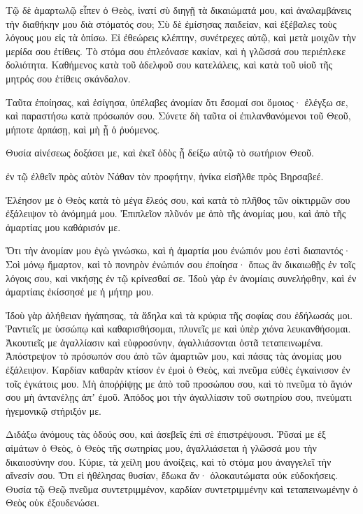 \begin{spacing}{1.1}
\begin{multicols}{2}
Τῷ δὲ ἁμαρτωλῷ εἶπεν ὁ Θεὸς, ἱνατί σὺ διηγῇ τὰ δικαιώματά μου, καὶ ἀναλαμβάνεις τὴν διαθήκην μου διὰ στόματός σου;
Σὺ δὲ ἐμίσησας παιδείαν, καὶ ἐξέβαλες τοὺς λόγους μου εἰς τὰ ὀπίσω.
Εἰ ἐθεώρεις κλέπτην, συνέτρεχες αὐτῷ, καὶ μετὰ μοιχῶν τὴν μερίδα σου ἐτίθεις.
Τὸ στόμα σου ἐπλεόνασε κακίαν, καὶ ἡ γλῶσσά σου περιέπλεκε δολιότητα.
Καθήμενος κατὰ τοῦ ἀδελφοῦ σου κατελάλεις, καὶ κατὰ τοῦ υἱοῦ τῆς μητρός σου ἐτίθεις σκάνδαλον.

Ταῦτα ἐποίησας, καὶ ἐσίγησα, ὑπέλαβες ἀνομίαν ὅτι ἔσομαί σοι ὅμοιος· ἐλέγξω σε, καὶ παραστήσω κατὰ πρόσωπόν σου.
Σύνετε δὴ ταῦτα οἱ ἐπιλανθανόμενοι τοῦ Θεοῦ, μήποτε ἁρπάσῃ, καὶ μὴ ᾖ ὁ ῥυόμενος.

Θυσία αἰνέσεως δοξάσει με, καὶ ἐκεῖ ὁδὸς ᾗ δείξω αὐτῷ τὸ σωτήριον Θεοῦ.

ἐν τῷ ἐλθεῖν πρὸς αὐτὸν Νάθαν τὸν προφήτην, ἡνίκα εἰσῆλθε πρὸς Βηρσαβεέ.

Ἐλέησον με ὁ Θεὸς κατὰ τὸ μέγα ἔλεός σου, καὶ κατὰ τὸ πλῆθος τῶν οἰκτιρμῶν σου ἐξάλειψον τὸ ἀνόμημά μου.
Ἐπιπλεῖον πλῦνόν με ἀπὸ τῆς ἀνομίας μου, καὶ ἀπὸ τῆς ἁμαρτίας μου καθάρισόν με.

Ὅτι τὴν ἀνομίαν μου ἐγὼ γινώσκω, καὶ ἡ ἁμαρτία μου ἐνώπιόν μου ἐστὶ διαπαντός·
Σοὶ μόνῳ ἥμαρτον, καὶ τὸ πονηρὸν ἐνώπιόν σου ἐποίησα· ὅπως ἂν δικαιωθῇς ἐν τοῖς λόγοις σου, καὶ νικήσῃς ἐν τῷ κρίνεσθαί σε.
Ἰδοὺ γὰρ ἐν ἀνομίαις συνελήφθην, καὶ ἐν ἁμαρτίαις ἐκίσσησέ με ἡ μήτηρ μου.

Ἰδοὺ γὰρ ἀλήθειαν ἠγάπησας, τὰ ἄδηλα καὶ τὰ κρύφια τῆς σοφίας σου ἐδήλωσάς μοι.
Ῥαντιεῖς με ὑσσώπῳ καὶ καθαρισθήσομαι, πλυνεῖς με καὶ ὑπὲρ χιόνα λευκανθήσομαι.
Ἀκουτιεῖς με ἀγαλλίασιν καὶ εὐφροσύνην, ἀγαλλιάσονται ὀστᾶ τεταπεινωμένα.
Ἀπόστρεψον τὸ πρόσωπόν σου ἀπὸ τῶν ἁμαρτιῶν μου, καὶ πάσας τὰς ἀνομίας μου ἐξάλειψον.
Καρδίαν καθαρὰν κτίσον ἐν ἐμοὶ ὁ Θεὸς, καὶ πνεῦμα εὐθὲς ἐγκαίνισον ἐν τοῖς ἐγκάτοις μου.
Μὴ ἀποῤῥίψῃς με ἀπὸ τοῦ προσώπου σου, καὶ τὸ πνεῦμα τὸ ἅγιόν σου μὴ ἀντανέλῃς ἀπʼ ἐμοῦ.
Ἀπόδος μοι τὴν ἀγαλλίασιν τοῦ σωτηρίου σου, πνεύματι ἡγεμονικῷ στήριξόν με.

Διδάξω ἀνόμους τὰς ὁδούς σου, καὶ ἀσεβεῖς ἐπὶ σὲ ἐπιστρέψουσι.
Ῥῦσαί με ἐξ αἱμάτων ὁ Θεὸς, ὁ Θεὸς τῆς σωτηρίας μου, ἀγαλλιάσεται ἡ γλῶσσά μου τὴν δικαιοσύνην σου.
Κύριε, τὰ χείλη μου ἀνοίξεις, καὶ τὸ στόμα μου ἀναγγελεῖ τὴν αἴνεσίν σου.
Ὅτι εἰ ἠθέλησας θυσίαν, ἔδωκα ἄν· ὁλοκαυτώματα οὐκ εὐδοκήσεις.
Θυσία τῷ Θεῷ πνεῦμα συντετριμμένον, καρδίαν συντετριμμένην καὶ τεταπεινωμένην ὁ Θεὸς οὐκ ἐξουδενώσει.


\end{multicols}
\end{spacing}
